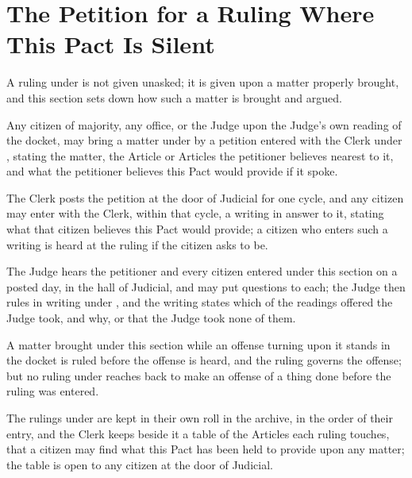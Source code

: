 \section{The Petition for a Ruling Where This Pact Is Silent}
\label{sec:judicial:petition-for-a-ruling-where-this-pact-is-silent}

A ruling under  is not given unasked; it is given upon a matter properly brought, and this section sets down how such a matter is brought and argued.

\begin{clauses}
\item Any citizen of majority, any office, or the Judge upon the Judge's own reading of the docket, may bring a matter under  by a petition entered with the Clerk under , stating the matter, the Article or Articles the petitioner believes nearest to it, and what the petitioner believes this Pact would provide if it spoke.
\item The Clerk posts the petition at the door of Judicial for one cycle, and any citizen may enter with the Clerk, within that cycle, a writing in answer to it, stating what that citizen believes this Pact would provide; a citizen who enters such a writing is heard at the ruling if the citizen asks to be.
\item The Judge hears the petitioner and every citizen entered under this section on a posted day, in the hall of Judicial, and may put questions to each; the Judge then rules in writing under , and the writing states which of the readings offered the Judge took, and why, or that the Judge took none of them.
\item A matter brought under this section while an offense turning upon it stands in the docket is ruled before the offense is heard, and the ruling governs the offense; but no ruling under  reaches back to make an offense of a thing done before the ruling was entered.
\item The rulings under  are kept in their own roll in the archive, in the order of their entry, and the Clerk keeps beside it a table of the Articles each ruling touches, that a citizen may find what this Pact has been held to provide upon any matter; the table is open to any citizen at the door of Judicial.
\end{clauses}

